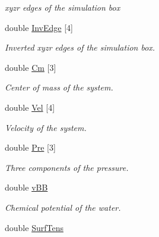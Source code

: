 \begin{DoxyCompactItemize}
\begin{DoxyCompactList}\small\item\em xyzr edges of the simulation box \end{DoxyCompactList}\item 
double \hyperlink{structGENERAL_aabbbbadc73659c7ef925b55cf4dd6aeb}{Inv\+Edge} \mbox{[}4\mbox{]}\hypertarget{structGENERAL_aabbbbadc73659c7ef925b55cf4dd6aeb}{}\label{structGENERAL_aabbbbadc73659c7ef925b55cf4dd6aeb}

\begin{DoxyCompactList}\small\item\em Inverted xyzr edges of the simulation box. \end{DoxyCompactList}\item 
double \hyperlink{structGENERAL_a7125116c90bd17b7d8d083e0e6771cb6}{Cm} \mbox{[}3\mbox{]}\hypertarget{structGENERAL_a7125116c90bd17b7d8d083e0e6771cb6}{}\label{structGENERAL_a7125116c90bd17b7d8d083e0e6771cb6}

\begin{DoxyCompactList}\small\item\em Center of mass of the system. \end{DoxyCompactList}\item 
double \hyperlink{structGENERAL_afd1b3747170c238c06ba3420cbc5c2a2}{Vel} \mbox{[}4\mbox{]}\hypertarget{structGENERAL_afd1b3747170c238c06ba3420cbc5c2a2}{}\label{structGENERAL_afd1b3747170c238c06ba3420cbc5c2a2}

\begin{DoxyCompactList}\small\item\em Velocity of the system. \end{DoxyCompactList}\item 
double \hyperlink{structGENERAL_a1c5ab9214cb52a6c7be112e52fb3a0ec}{Pre} \mbox{[}3\mbox{]}\hypertarget{structGENERAL_a1c5ab9214cb52a6c7be112e52fb3a0ec}{}\label{structGENERAL_a1c5ab9214cb52a6c7be112e52fb3a0ec}

\begin{DoxyCompactList}\small\item\em Three components of the pressure. \end{DoxyCompactList}\item 
double \hyperlink{structGENERAL_a1f1783fb13c526c8a43fac88be809a61}{v\+BB}\hypertarget{structGENERAL_a1f1783fb13c526c8a43fac88be809a61}{}\label{structGENERAL_a1f1783fb13c526c8a43fac88be809a61}

\begin{DoxyCompactList}\small\item\em Chemical potential of the water. \end{DoxyCompactList}\item 
double \hyperlink{structGENERAL_a118a5bd5025a170e18a8ec882f7292cf}{Surf\+Tens}\hypertarget{structGENERAL_a118a5bd5025a170e18a8ec882f7292cf}{}\label{structGENERAL_a118a5bd5025a170e18a8ec882f7292cf}


\end{DoxyCompactItemize}
